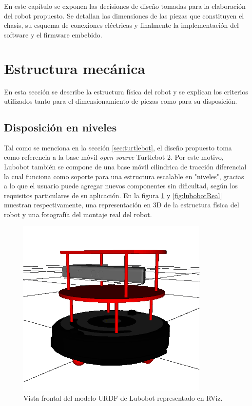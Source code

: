\label{Capitulo3}

En este capítulo se exponen las decisiones de diseño tomadas para la elaboración del robot propuesto. Se detallan las dimensiones de las piezas que constituyen el chasis, su esquema de conexiones eléctricas y finalmente la implementación del software y el firmware embebido.

\section{Estructura mecánica}

En esta sección se describe la estructura física del robot y se explican los criterios utilizados tanto para el dimensionamiento de piezas como para su disposición.

\subsection{Disposición en niveles}
Tal como se menciona en la sección \ref{sec:turtlebot}, el diseño propuesto toma como referencia a la base móvil \textit{open source} Turtlebot 2. Por este motivo, Lubobot también se compone de una base móvil cilindrica de tracción diferencial la cual funciona como soporte para una estructura escalable en "niveles", gracias a lo que el usuario puede agregar nuevos componentes sin dificultad, según los requisitos particulares de su aplicación. En la figura \ref{fig:lubobotURDF} y \ref{fig:lubobotReal} muestran respectivamente, una representación en 3D de la estructura física del robot y una fotografía del montaje real del robot.

\begin{figure}[ht]
  \centering
  \includegraphics[scale=0.5]{./Figures/lubobot_urdf.png}
  \caption{Vista frontal del modelo URDF de Lubobot representado en RViz.}
  \label{fig:lubobotURDF}
\end{figure}

